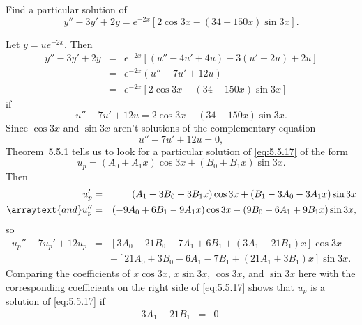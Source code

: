 \setcounter{example}{4}
\setcounter{equation}{15}
\begin{example}
  \label{example:5.5.5} \rm Find a particular solution of
  \begin{equation}
    \label{eq:5.5.16}y''-3y'+2y=e^{-2x}\left[2\cos3x-(34-150x)\sin3x\right].
  \end{equation}
\end{example}
\setcounter{equation}{16}
\begin{examplesolution}
\solution Let $y=ue^{-2x}$. Then
\begin{eqnarray*}
  y''-3y'+2y & = & e^{-2x}\left[(u''-4u'+4u)-3(u'-2u)+2u\right] \\
             & = & e^{-2x}(u''-7u'+12u)                         \\
             & = & e^{-2x}\left[2\cos3x-(34-150x)\sin3x\right]
\end{eqnarray*}
if
\begin{equation}
  \label{eq:5.5.17}u''-7u'+12u=2\cos3x-(34-150x)\sin3x.
\end{equation}
Since $\cos3x$ and $\sin3x$ aren't solutions of the complementary equation
\[
  u''-7u'+12u=0,
\]
Theorem~5.5.1 tells us to look for a particular solution of \eqref{eq:5.5.17} of the
form
\begin{equation}
  \label{eq:5.5.18}u_{p}=(A_{0}+A_{1}x)\cos3x+(B_{0}+B_{1}x)\sin3x.
\end{equation}
Then
\begin{eqnarray*}
  u_{p}'                 & = & (A_{1}+3B_{0}+3B_{1}x)\cos3x+(B_{1}-3A_{0}-3A_{1}x)\sin3x \\
  \arraytext{and}u_{p}'' & = & (-9A_{0}+6B_{1}-9A_{1}x)\cos3x-(9B_{0}+6A_{1}+9B_{1}x)\sin3x,
\end{eqnarray*}
so
\begin{eqnarray*}
  u_{p}''-7u_{p}'+12u_{p} & = & \left[3A_{0}-21B_{0}-7A_{1}+6B_{1}+(3A_{1}-21B_{1})x\right]\cos3x \\
                          &   & +\left[21A_{0}+3B_{0}-6A_{1}-7B_{1}+(21A_{1}+3B_{1})x\right]\sin3x.
\end{eqnarray*}
Comparing the coefficients of $x\cos3x$, $x\sin3x$, $\cos3x$, and $\sin3x$ here with the
corresponding coefficients on the right side of \eqref{eq:5.5.17} shows that $u_{p}$ is a solution
of \eqref{eq:5.5.17} if
\begin{equation}
  \label{eq:5.5.19}
  \begin{array}{rcr}
    3A_{1}-21B_{1}                                     & = & 0\phantom{.}             \\

\end{array}
\end{equation}
\end{examplesolution}
